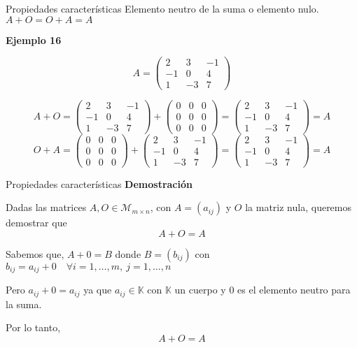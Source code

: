 \documentclass[
  ignorenonframetext,
]{beamer}
\begin{document}
\begin{frame}{Propiedades características}
\protect\hypertarget{propiedades-caracteruxedsticas-4}{}
Elemento neutro de la suma o elemento nulo. \(A+O=O+A=A\)

\textbf{Ejemplo 16}

\[A = \begin{pmatrix}2&3&-1\\-1&0&4\\1&-3&7\end{pmatrix}\]

\[A+O = \begin{pmatrix}2&3&-1\\-1&0&4\\1&-3&7\end{pmatrix}+\begin{pmatrix}0&0&0\\0&0&0\\0&0&0\end{pmatrix}=\begin{pmatrix}2&3&-1\\-1&0&4\\1&-3&7\end{pmatrix}=A\]
\[O+A = \begin{pmatrix}0&0&0\\0&0&0\\0&0&0\end{pmatrix}+\begin{pmatrix}2&3&-1\\-1&0&4\\1&-3&7\end{pmatrix}=\begin{pmatrix}2&3&-1\\-1&0&4\\1&-3&7\end{pmatrix}=A\]
\end{frame}

\begin{frame}{Propiedades características}
\protect\hypertarget{propiedades-caracteruxedsticas-5}{}
\textbf{Demostración}

Dadas las matrices \(A,O\in\mathcal{M}_{m\times n}\), con
\(A = (a_{ij})\) y \(O\) la matriz nula, queremos demostrar que
\[A+O = A\]

Sabemos que, \(A+0 = B\) donde \(B = (b_{ij})\) con
\(b_{ij} = a_{ij}+0\quad\forall i=1,\dots,m,\ j=1,\dots,n\)

Pero \(a_{ij} + 0 = a_{ij}\) ya que \(a_{ij}\in\mathbb{K}\) con
\(\mathbb{K}\) un cuerpo y 0 es el elemento neutro para la suma.

Por lo tanto, \[ A+O= A \]
\end{frame}
\end{document}
